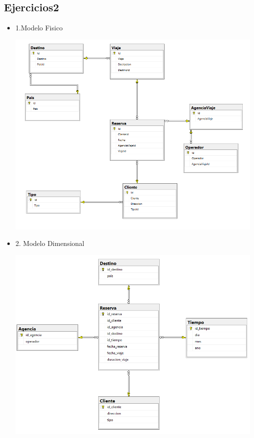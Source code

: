 \subsection {Ejercicios2}
\begin{itemize}
 \item 1.Modelo Fisico
	\begin{center}
	\includegraphics[width=18cm]{./Imagenes/mf2}
	\end{center}	
\newpage
 \item 2. Modelo Dimensional
	\begin{center}
	\includegraphics[width=18cm]{./Imagenes/md2}
	\end{center}	
\newpage
\end{itemize}
